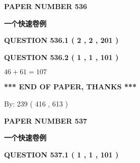 \documentclass{ctexart}
\begin{document}
   
 {\textbf{ \Large{ PAPER NUMBER  536  }}}
   
   
\vspace{0.2in}
   
   
   
   
   
   
 \vspace{0.2in}
{\LARGE {\textbf{ 一个快速卷例}}}
   
   
  
\vspace{0.2in}
  
{\textbf{\Large{QUESTION
536.1 
 ( 2 , 2 , 201 )
}}}
  
  
  
\vspace{0.2in}
  
{\textbf{\Large{QUESTION
536.2 
 ( 1 , 1 , 101 )
}}}
  
  
 
 

$ %
46 +  %
61=   %
107$
 
 
   
   
 \vspace{0.2in}
 
   
   
   
   
\vspace{1.0in} 
{\textbf{\large{ *** END OF PAPER, THANKS *** }}} 
   
   
\hspace{1.0in} By: 
 239 ( 416 ,  613 )
   
   
   
   
\newpage 
\setcounter{page}{ 
   537001 } 
   
   
   
   
 {\textbf{ \Large{ PAPER NUMBER  537  }}}
   
   
\vspace{0.2in}
   
   
   
   
   
   
 \vspace{0.2in}
{\LARGE {\textbf{ 一个快速卷例}}}
   
   
  
\vspace{0.2in}
  
{\textbf{\Large{QUESTION
537.1 
 ( 1 , 1 , 101 )
}}}
  
\end{document}

